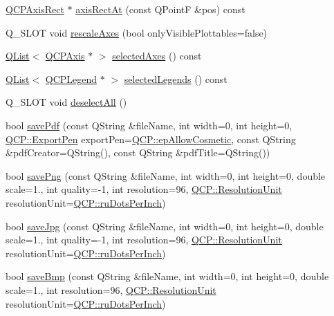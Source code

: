 \begin{DoxyCompactItemize}
\item 
\hyperlink{class_q_c_p_axis_rect}{Q\+C\+P\+Axis\+Rect} $\ast$ \hyperlink{class_q_custom_plot_af903c081aaf7201631d3607905cc9afc}{axis\+Rect\+At} (const Q\+PointF \&pos) const 
\item 
Q\+\_\+\+S\+L\+OT void \hyperlink{class_q_custom_plot_ad86528f2cee6c7e446dea4a6e8839935}{rescale\+Axes} (bool only\+Visible\+Plottables=false)
\item 
\hyperlink{class_q_list}{Q\+List}$<$ \hyperlink{class_q_c_p_axis}{Q\+C\+P\+Axis} $\ast$ $>$ \hyperlink{class_q_custom_plot_aa6baf867e8beb96ed5bd471f83ece903}{selected\+Axes} () const 
\item 
\hyperlink{class_q_list}{Q\+List}$<$ \hyperlink{class_q_c_p_legend}{Q\+C\+P\+Legend} $\ast$ $>$ \hyperlink{class_q_custom_plot_a1ea6297300c3e2770e65f95836411755}{selected\+Legends} () const 
\item 
Q\+\_\+\+S\+L\+OT void \hyperlink{class_q_custom_plot_a9d4808ab925b003054085246c92a257c}{deselect\+All} ()
\item 
bool \hyperlink{class_q_custom_plot_ad5acd34f6b39c3516887d7e54fec2412}{save\+Pdf} (const Q\+String \&file\+Name, int width=0, int height=0, \hyperlink{namespace_q_c_p_a17844f19e1019693a953e1eb93536d2f}{Q\+C\+P\+::\+Export\+Pen} export\+Pen=\hyperlink{namespace_q_c_p_a17844f19e1019693a953e1eb93536d2fa34716c7388ad3a2ff3ac27e57fb83a5b}{Q\+C\+P\+::ep\+Allow\+Cosmetic}, const Q\+String \&pdf\+Creator=Q\+String(), const Q\+String \&pdf\+Title=Q\+String())
\item 
bool \hyperlink{class_q_custom_plot_ac92cc9256d12f354b40a4be4600b5fb9}{save\+Png} (const Q\+String \&file\+Name, int width=0, int height=0, double scale=1., int quality=-\/1, int resolution=96, \hyperlink{namespace_q_c_p_a715d46153da230990aa887d0f0602452}{Q\+C\+P\+::\+Resolution\+Unit} resolution\+Unit=\hyperlink{namespace_q_c_p_a715d46153da230990aa887d0f0602452a9def6fd83de9b4108ad999541a42ac6a}{Q\+C\+P\+::ru\+Dots\+Per\+Inch})
\item 
bool \hyperlink{class_q_custom_plot_a76f0d278e630a711fa6f48048cfd83e4}{save\+Jpg} (const Q\+String \&file\+Name, int width=0, int height=0, double scale=1., int quality=-\/1, int resolution=96, \hyperlink{namespace_q_c_p_a715d46153da230990aa887d0f0602452}{Q\+C\+P\+::\+Resolution\+Unit} resolution\+Unit=\hyperlink{namespace_q_c_p_a715d46153da230990aa887d0f0602452a9def6fd83de9b4108ad999541a42ac6a}{Q\+C\+P\+::ru\+Dots\+Per\+Inch})
\item 
bool \hyperlink{class_q_custom_plot_ae3a86ed0795670e50afa21759d4fa13d}{save\+Bmp} (const Q\+String \&file\+Name, int width=0, int height=0, double scale=1., int resolution=96, \hyperlink{namespace_q_c_p_a715d46153da230990aa887d0f0602452}{Q\+C\+P\+::\+Resolution\+Unit} resolution\+Unit=\hyperlink{namespace_q_c_p_a715d46153da230990aa887d0f0602452a9def6fd83de9b4108ad999541a42ac6a}{Q\+C\+P\+::ru\+Dots\+Per\+Inch})

\end{DoxyCompactItemize}
